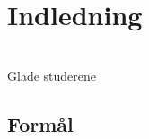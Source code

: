
\section{Indledning}

\begin{center}
\setlength\fboxsep{0pt}
\setlength\fboxrule{2pt}
\\
Glade studerene
 \end{center} 

\subsection{Formål}
 